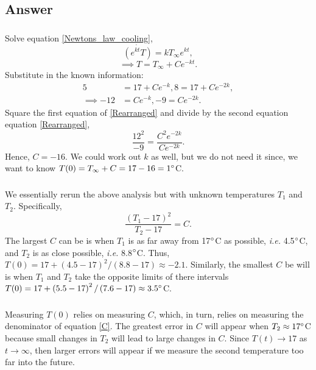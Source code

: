 \documentclass[10pt]{article}
\newcommand{\bb}{\begin{equation}}
\newcommand{\ee}{\end{equation}}
\newcommand{\eqn}[1]{equation \eqref{#1}}
\newcommand{\ie}{\emph{i.e.} }
\renewcommand{\l}{\left(}
\renewcommand{\r}{\right)}
\begin{document}
\begin{Answ}
\subsection{Answer}
\subsubsection{}
Solve \eqn{Newtons_law_cooling},
\bb
\dot{\l e^{kt}T\r}=kT_\infty e^{kt},
\ee
\bb
\implies T=T_\infty+Ce^{-kt}.
\ee
Substitute in the known information:
\begin{align}
5&=17 +Ce^{-k},8=17+Ce^{-2k},\\
\implies -12&= Ce^{-k},-9=Ce^{-2k}.\label{Rearranged}
\end{align}
Square the first equation of \eqref{Rearranged} and divide by the second equation \eqn{Rearranged},
\bb
\frac{12^2}{-9}=\frac{C^2e^{-2k}}{Ce^{-2k}}.
\ee
Hence, $C=-16$. We could work out $k$ as well, but we do not need it since, we want to know $T(0)=T_\infty+C=17-16=1\degree$C.

\subsubsection{}
We essentially rerun the above analysis but with unknown temperatures $T_1$ and $T_2$. Specifically,
\bb
\frac{\l T_1-17\r^2}{T_2-17}=C.\label{C}
\ee
The largest $C$ can be is when $T_1$ is as far away from 17$\degree$C as possible, \ie 4.5$\degree$C, and $T_2$ is as close possible, \ie 8.8$\degree$C. Thus, $T(0)=17+\l 4.5-17\r^2/\l 8.8-17\r\approx-2.1$. Similarly, the smallest $C$ be will is when $T_1$ and $T_2$ take the opposite limits of there intervals $T(0)=17+\l 5.5-17\r^2/\l 7.6-17\r\approx3.5\degree$C.
\subsubsection{}
Measuring $T(0)$ relies on measuring $C$, which, in turn, relies on measuring the denominator of \eqn{C}. The greatest error in $C$ will appear when $T_2\approx17\degree$C because small changes in $T_2$ will lead to large changes in $C$. Since $T(t)\rightarrow 17$ as $t\rightarrow\infty$, then larger errors will appear if we measure the second temperature too far into the future.
\end{Answ}
\end{document}
